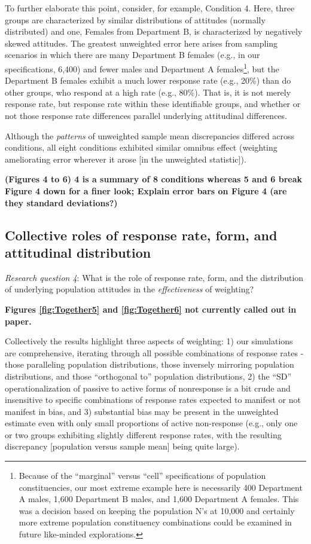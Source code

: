 \documentclass[
  man,mask]{apa7}
\begin{document}
To further elaborate this point, consider, for example, Condition 4. Here, three groups are characterized by similar distributions of attitudes (normally distributed) and one, Females from Department B, is characterized by negatively skewed attitudes. The greatest unweighted error here arises from sampling scenarios in which there are many Department B females (e.g., in our specifications, 6,400) and fewer males and Department A females\footnote{Because of the ``marginal'' versus ``cell'' specifications of population constituencies, our most extreme example here is necessarily 400 Department A males, 1,600 Department B males, and 1,600 Department A females. This was a decision based on keeping the population N's at 10,000 and certainly more extreme population constituency combinations could be examined in future like-minded explorations.}, but the Department B females exhibit a much lower response rate (e.g., 20\%) than do other groups, who respond at a high rate (e.g., 80\%). That is, it is not merely response rate, but response rate within these identifiable groups, and whether or not those response rate differences parallel underlying attitudinal differences.

Although the \emph{patterns} of unweighted sample mean discrepancies differed across conditions, all eight conditions exhibited similar omnibus effect (weighting ameliorating error wherever it arose {[}in the unweighted statistic{]}).

\textbf{(Figures 4 to 6) 4 is a summary of 8 conditions whereas 5 and 6 break Figure 4 down for a finer look; Explain error bars on Figure 4 (are they standard deviations?)}

\hypertarget{collective-roles-of-response-rate-form-and-attitudinal-distribution}{%
\subsection{Collective roles of response rate, form, and attitudinal distribution}\label{collective-roles-of-response-rate-form-and-attitudinal-distribution}}

\emph{Research question 4}: What is the role of response rate, form, and the distribution of underlying population attitudes in the \emph{effectiveness} of weighting?

\textbf{Figures \ref{fig:Together5} and \ref{fig:Together6} not currently called out in paper.}

Collectively the results highlight three aspects of weighting: 1) our simulations are comprehensive, iterating through all possible combinations of response rates - those paralleling population distributions, those inversely mirroring population distributions, and those ``orthogonal to'' population distributions, 2) the ``SD'' operationalization of passive to active forms of nonresponse is a bit crude and insensitive to specific combinations of response rates expected to manifest or not manifest in bias, and 3) substantial bias may be present in the unweighted estimate even with only small proportions of active non-response (e.g., only one or two groups exhibiting slightly different response rates, with the resulting discrepancy {[}population versus sample mean{]} being quite large).
\end{document}
